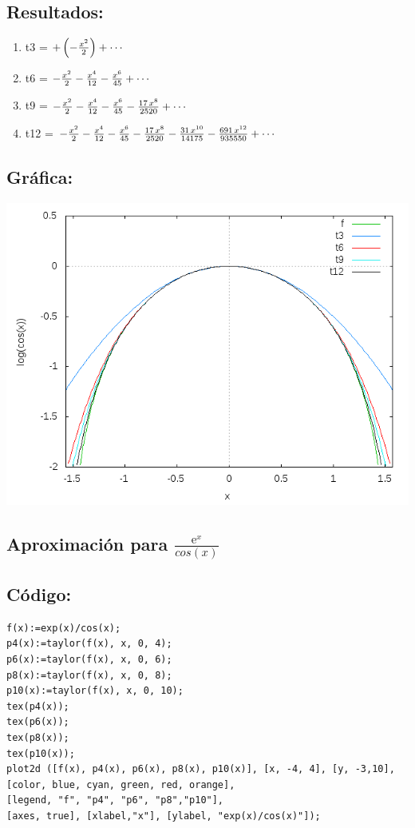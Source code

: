 \documentclass[10pt]{article}
\begin{document}
\subsection*{Resultados:}
\begin{enumerate}
\item t3 = $+\left(-{{x^2}\over{2}}\right)+\cdots $
\item t6 = $-{{x^2}\over{2}}-{{x^4}\over{12}}-{{x^6}\over{45}}+\cdots $
\item t9 = $-{{x^2}\over{2}}-{{x^4}\over{12}}-{{x^6}\over{45}}-{{17\,x^8}\over{
 2520}}+\cdots $
\item t12 = $-{{x^2}\over{2}}-{{x^4}\over{12}}-{{x^6}\over{45}}-{{17\,x^8}\over{
 2520}}-{{31\,x^{10}}\over{14175}}-{{691\,x^{12}}\over{935550}}
 +\cdots $
\end{enumerate}
\subsection*{Gráfica:}
\includegraphics[scale=0.6]{plot3}

\newpage
\subsection{Aproximación para $\frac{\mathrm{e}^{x}}{cos(x)}$}
\subsection*{Código:}
\begin{verbatim}
f(x):=exp(x)/cos(x);
p4(x):=taylor(f(x), x, 0, 4);
p6(x):=taylor(f(x), x, 0, 6);
p8(x):=taylor(f(x), x, 0, 8);
p10(x):=taylor(f(x), x, 0, 10);
tex(p4(x));
tex(p6(x));
tex(p8(x));
tex(p10(x));
plot2d ([f(x), p4(x), p6(x), p8(x), p10(x)], [x, -4, 4], [y, -3,10], 
[color, blue, cyan, green, red, orange], 
[legend, "f", "p4", "p6", "p8","p10"], 
[axes, true], [xlabel,"x"], [ylabel, "exp(x)/cos(x)"]);
\end{verbatim}
\end{document}
